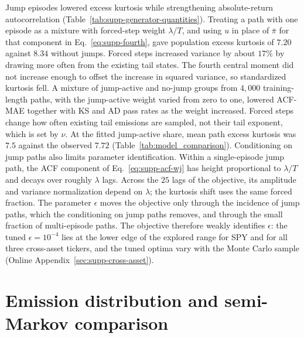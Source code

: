 Jump episodes lowered excess kurtosis while strengthening
absolute-return autocorrelation
(Table~\ref{tab:supp-generator-quantities}). Treating a path with one
episode as a mixture with forced-step weight $\lambda/T$, and using
$u$ in place of $\bar\pi$ for that component in
Eq.~\eqref{eq:supp-fourth}, gave population excess kurtosis of $7.20$
against $8.34$ without jumps. Forced steps increased variance by
about $17\%$ by drawing more often from the existing tail states.
The fourth central moment did not increase enough to offset the
increase in squared variance, so standardized kurtosis fell. A mixture of jump-active and no-jump groups from $4{,}000$ training-length paths, with the jump-active weight varied from zero to one, lowered ACF-MAE together with KS and AD pass rates as the weight increased. Forced steps change how often existing tail emissions are sampled, not their tail exponent, which is set by $\nu$. At the fitted jump-active share, mean path excess kurtosis was $7.5$ against the observed $7.72$ (Table~\ref{tab:model_comparison}).
Conditioning on jump paths also limits parameter identification. Within a single-episode jump path, the ACF
component of Eq.~\eqref{eq:supp-acf-wj} has height proportional to
$\lambda / T$ and decays over roughly $\lambda$ lags. Across the
$25$ lags of the objective, its amplitude and variance normalization
depend on $\lambda$; the kurtosis shift uses the same forced fraction.
 The parameter $\epsilon$ moves
the objective only through the incidence of jump paths, which the
conditioning on jump paths removes, and through the small fraction of
multi-episode paths. The objective therefore weakly identifies $\epsilon$: the tuned $\epsilon = 10^{-4}$ lies at the lower edge of the
explored range for SPY and for all three cross-asset tickers, and the
tuned optima vary with the Monte Carlo sample (Online
Appendix~\ref{sec:supp-cross-asset}).

\section{Emission distribution and semi-Markov comparison}
\label{sec:supp-emission-hsmm}

